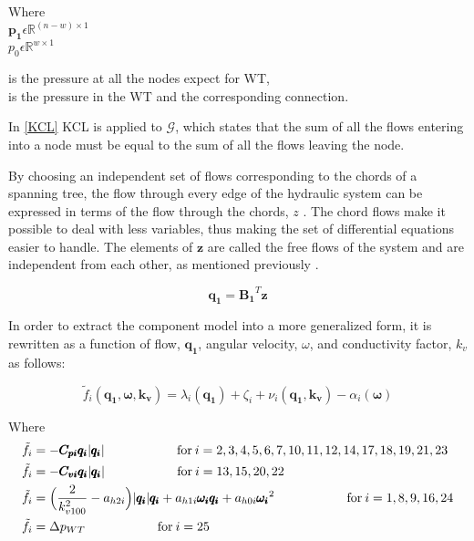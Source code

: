 \begin{minipage}[t]{0.20\textwidth}
Where\\
\hspace*{8mm} $\pmb{p_1} \epsilon \mathbb{R}^{(n-w) \times 1}$  \\
\hspace*{8mm} $p_0 \epsilon \mathbb{R}^{w \times 1} $ 
\end{minipage}
\begin{minipage}[t]{0.68\textwidth}
\vspace*{2mm}
\hspace*{4mm} is the pressure at all the nodes expect for WT,\\
\hspace*{4mm} is the pressure in the WT and the corresponding connection.
\end{minipage}

In \eqref{KCL} KCL is applied to $\mathcal{G}$, which states that the sum of all the flows entering into a node must be equal to the sum of all the flows leaving the node.

By choosing an independent set of flows corresponding to the chords of a spanning tree, the flow through every edge of the hydraulic system can be expressed in terms of the flow through the chords, $z$ \cite{GraphModel}.
The chord flows make it possible to deal with less variables, thus making the set of differential equations easier to handle.  The elements of $\pmb{z}$ are called the free flows of the system and are independent from each other, as mentioned previously \cite{GraphTheoryCarsten}.

\begin{equation}
  \pmb{q_1} = \pmb{B_1} ^{T}  \pmb{z}
  \label{ChordRelation}
\end{equation}

In order to extract the component model into a more generalized form, it is rewritten as a function of flow, $\pmb{q_1}$, angular velocity, $\omega$, and conductivity factor, $k_v$ as follows:

\begin{equation}
  \tilde{f}_i(\pmb{q_1}, \pmb{\omega}, \pmb{k_v}) = \lambda_i(\pmb{q_1}) + \zeta_i + \nu_i(\pmb{q_1}, \pmb{k_v}) - \alpha_i(\pmb{\omega})
  \label{ComponentFunction}
\end{equation}

Where\\
\begin{align}
\tilde{f}_i &= -\pmb{C_{pi} q_i} |\pmb{q_i}|  \hskip 2cm  \text{for}\: i = 2,3,4,5,6,7,10,11,12,14,17,18,19,21,23 \\
\tilde{f}_i &= -\pmb{C_{vi} q_i} |\pmb{q_i}|  \hskip 2cm  \text{for}\:i = 13,15,20,22\\
\tilde{f}_i &= \Big(\frac{2}{k_{v100}^2} - a_{h2i}\Big)|\pmb{q_i}| \pmb{q_i}  + a_{h1i} \pmb{\omega_{i}} \pmb{q_i} + a_{h0i}\pmb{{\omega_i}}^2 \hskip 2cm  \text{for}\: i = 1,8,9,16,24 \\
\tilde{f}_i &= \Delta p_{WT}  \hskip 2cm  \text{for}\:i = 25
\end{align}

